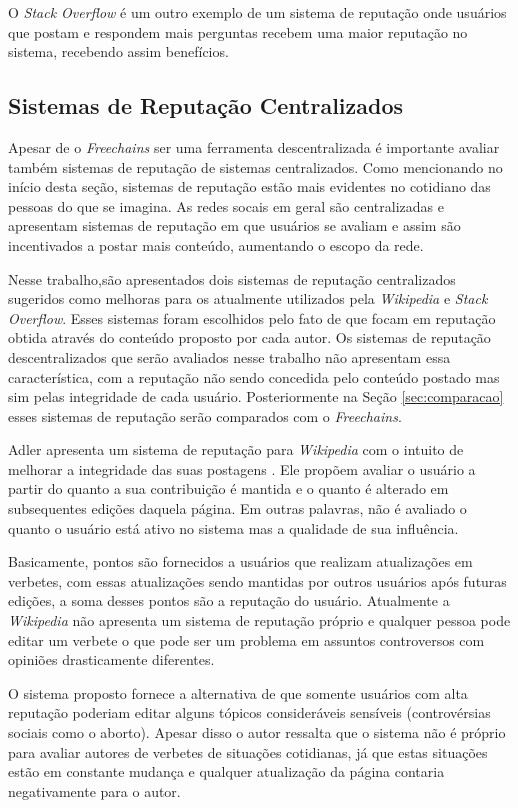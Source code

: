 \documentclass[12pt]{article}
\newcommand{\FC} {\emph{Freechains}\xspace}
\begin{document}
O \emph{Stack Overflow} é um outro exemplo de um sistema de reputação onde usuários que postam e respondem mais perguntas recebem uma maior reputação no sistema, recebendo assim benefícios.

\subsection{Sistemas de Reputação Centralizados} \label{subsec:SRCentra}

Apesar de o \FC ser uma ferramenta descentralizada é importante avaliar também sistemas de reputação de sistemas centralizados. 
Como mencionando no início desta seção, sistemas de reputação estão mais evidentes no cotidiano das pessoas do que se imagina. 
As redes socais em geral são centralizadas e apresentam sistemas de reputação em que usuários se avaliam e assim são incentivados a postar mais conteúdo, aumentando o escopo da rede.

Nesse trabalho,são apresentados dois sistemas de reputação centralizados sugeridos como melhoras para os atualmente utilizados pela \emph{Wikipedia} e \emph{Stack Overflow}. 
Esses sistemas foram escolhidos pelo fato de que focam em reputação obtida através do conteúdo proposto por cada autor. 
Os sistemas de reputação descentralizados que serão avaliados nesse trabalho não apresentam essa característica, com a reputação não sendo concedida pelo conteúdo postado mas sim pelas integridade de cada usuário. 
Posteriormente na Seção \ref{sec:comparacao} esses sistemas de reputação serão comparados com o \FC. 

Adler apresenta um sistema de reputação para \emph{Wikipedia} com o intuito de melhorar a integridade das suas postagens \cite{adler2007content}. 
Ele propõem avaliar o usuário a partir do quanto a sua contribuição é mantida e o quanto é alterado em subsequentes edições daquela página. 
Em outras palavras, não é avaliado o quanto o usuário está ativo no sistema mas a qualidade de sua influência. 

Basicamente, pontos são fornecidos a usuários que realizam atualizações em verbetes, com essas atualizações sendo  mantidas por outros usuários após futuras edições, a soma desses pontos são a reputação do usuário. 
Atualmente a \emph{Wikipedia} não apresenta um sistema de reputação próprio e qualquer pessoa pode editar um verbete o que pode ser um problema em assuntos controversos com opiniões drasticamente diferentes.

O sistema proposto fornece a alternativa de que somente usuários com alta reputação poderiam editar alguns tópicos consideráveis sensíveis (controvérsias sociais como o aborto). 
Apesar disso o autor ressalta que o sistema não é próprio para avaliar autores de verbetes de situações cotidianas, já que estas situações estão em constante mudança e qualquer atualização da página contaria negativamente para o autor. 
\end{document}
